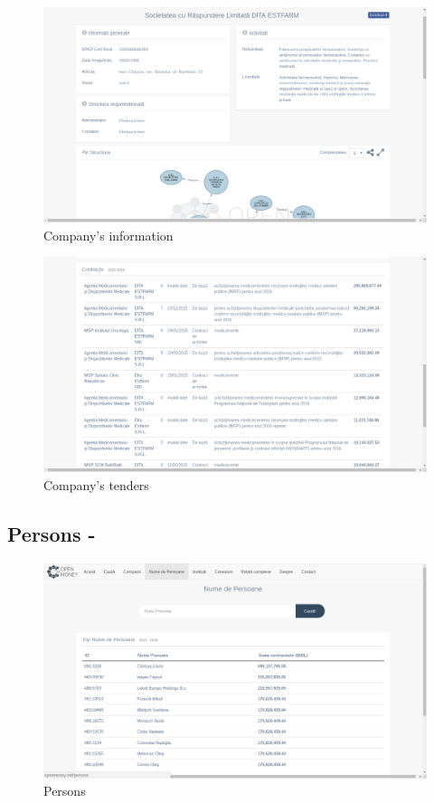 \documentclass[12pt]{article}
\begin{document}
	\begin{figure}[!ht] 
	\renewcommand\thefigure{3} %
	\centering 
	\includegraphics[width=17cm]{company_info.png} 
	\caption{ Company's information }\label{fig4} 
	\end{figure}
	
	\begin{figure}[!ht] 
	\renewcommand\thefigure{4} %
	\centering 
	\includegraphics[width=17cm]{company_tenders.png} 
	\caption{ Company's tenders }\label{fig4}
	\end{figure}
	
\newpage
\subsection{Persons - }
	\begin{figure}[!ht] 
	\renewcommand\thefigure{5} %
	\centering 
	\includegraphics[width=17cm]{persons.png} 
	\caption{ Persons }\label{fig4} 
	\end{figure}
	
\end{document}
